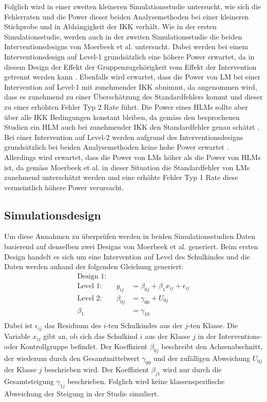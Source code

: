 \documentclass[12pt]{article}\usepackage[]{graphicx}\usepackage[]{color}
\begin{document}
Folglich wird in einer zweiten kleineren Simulationsstudie untersucht, wie sich die Fehlerraten und die Power dieser beiden Analysemethoden bei einer kleineren Stichprobe und in Abhängigkeit der IKK verhält. Wie in der ersten Simulationsstudie, werden auch in der zweiten Simulationsstudie die beiden Interventionsdesigns von Moerbeek et al. \citeyearpar{MOERBEEK2003341} untersucht. Dabei werden bei einem Interventionsdesign auf Level-1 grundsätzlich eine höhere Power erwartet, da in diesem Design der Effekt der Gruppenzugehörigkeit vom Effekt der Intervention getrennt werden kann \citep{moerbeek2000design}. Ebenfalls wird erwartet, dass die Power von LM bei einer Intervention auf Level-1 mit zunehmender IKK abnimmt, da angenommen wird, dass es zunehmend zu einer Überschätzung des Standardfehlers kommt und dieser zu einer erhöhten Fehler Typ 2 Rate führt. Die Power eines HLMs sollte aber über alle IKK Bedingungen konstant bleiben, da gemäss den besprochenen Studien ein HLM auch bei zunehmender IKK den Standardfehler genau schätzt \citep{mcneish2014analyzing}. Bei einer Intervention auf Level-2 werden aufgrund des Interventionsdesigns grundsätzlich bei beiden Analysemethoden keine hohe Power erwartet \citep{moerbeek2000design}. Allerdings wird erwartet, dass die Power von LMs höher als die Power von HLMs ist, da gemäss Moerbeek et al. \citeyearpar{MOERBEEK2003341} in dieser Situation die Standardfehler von LMs zunehmend unterschätzt werden und eine erhöhte Fehler Typ 1 Rate diese vermeintlich höhere Power verursacht.

\subsection{Simulationsdesign} \label{section:sim_design}
Um diese Annahmen zu überprüfen werden in beiden Simulationsstudien Daten basierend auf denselben zwei Designs von Moerbeek et al. \citeyearpar{MOERBEEK2003341} generiert. Beim ersten Design handelt es sich um eine Intervention auf Level des Schulkindes und die Daten werden anhand der folgenden Gleichung generiert:
\begin{equation} 
\begin{split}
\text{Design 1:}\\	
 \text{Level 1:}  \qquad y_{ij} & = \beta_{0j} + \beta_{1}x_{ij} + \epsilon_{ij}\\
 \text{Level 2:} \qquad \beta_{0j} & = \gamma_{00} + U_{0j}\\
 \beta_{1} & = \gamma_{10}\\
 \end{split}	
\end{equation} 
Dabei ist $\epsilon_{ij}$ das Residuum des $i$-ten Schulkindes aus der $j$-ten Klasse. Die Variable $x_{ij}$ gibt an, ob sich das Schulkind $i$ aus der Klasse $j$ in der Interventions- oder Kontrollgruppe befindet. Der Koeffizient $\beta_{0j}$ beschreibt den Achsenabschnitt, der wiederum durch den Gesamtmittelwert $\gamma_{00}$ und der zufälligen Abweichung $U_{0j}$ der Klasse $j$ beschrieben wird. Der Koeffizient $\beta_{j1}$ wird nur durch die Gesamtsteigung $\gamma_{1j}$ beschrieben. Folglich wird keine klassenspezifische Abweichung der Steigung in der Studie simuliert.
\end{document}
